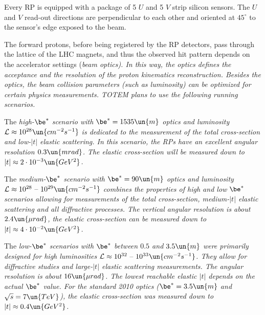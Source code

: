 
Every RP is equipped with a package of 5 $U$ and 5 $V$ strip silicon sensors. The $U$ and $V$ read-out directions are perpendicular to each other and oriented at $45^\circ$ to the sensor's edge exposed to the beam.

The forward protons, before being registered by the RP detectors, pass through the lattice of the LHC magnets, and thus the observed hit pattern depends on the accelerator settings (\em{beam optics}). In this way, the optics defines the acceptance and the resolution of the proton kinematics reconstruction. Besides the optics, the beam collision parameters (such as luminosity) can be optimized for certain physics measurements. TOTEM plans to use the following running scenarios.

\> The \em{high-$\be^*$} scenario with $\be^* = 1535\un{m}$ optics and luminosity ${\cal L} \approx 10^{28} \un{cm^{-2}s^{-1}}$ is dedicated to the measurement of the total cross-section and low-$|t|$ elastic scattering. In this scenario, the RPs have an excellent angular resolution $0.3\un{mrad}$. The elastic cross-section will be measured down to $|t| \approx 2\cdot10^{-3}\un{GeV^2}$.

\> The \em{medium-$\be^*$} scenario with $\be^* = 90\un{m}$ optics and luminosity ${\cal L} \approx 10^{28} \hbox{ -- } 10^{29}\un{cm^{-2}s^{-1}}$ combines the properties of high and low $\be^*$ scenarios allowing for measurements of the total cross-section, medium-$|t|$ elastic scattering and all diffractive processes. The vertical angular resolution is about $2.4\un{\mu rad}$, the elastic cross-section can be measured down to $|t| \approx 4\cdot 10^{-2}\un{GeV^2}$.

\> The \em{low-$\be^*$} scenarios with $\be^*$ between $0.5$ and $3.5\un{m}$ were primarily designed for high luminosities ${\cal L} \approx 10^{32} \hbox{ -- } 10^{33}\un{cm^{-2}s^{-1}}$. They allow for diffractive studies and large-$|t|$ elastic scattering measurements. The angular resolution is about $16\un{\mu rad}$. The lowest reachable elastic $|t|$ depends on the actual $\be^*$ value. For the standard 2010 optics ($\be^* = 3.5\un{m}$ and $\sqrt s = 7\un{TeV}$), the elastic cross-section was measured down to $|t| \approx 0.4\un{GeV^2}$.

